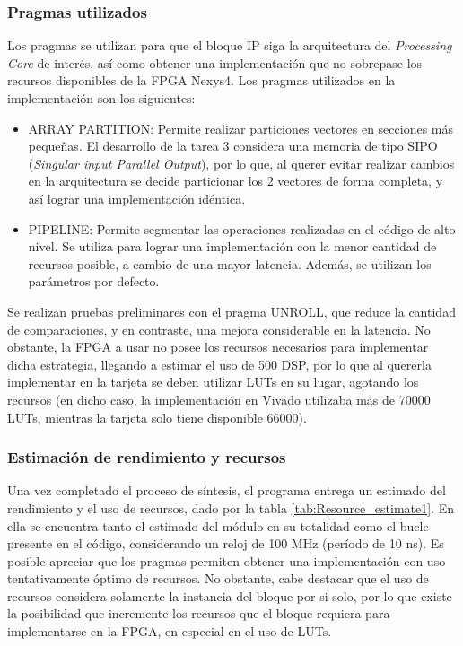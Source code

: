 \documentclass[conference]{IEEEtran}
\begin{document}
\subsubsection{Pragmas utilizados}
Los pragmas se utilizan para que el bloque IP siga la arquitectura del \textit{Processing Core} de interés, así como obtener una implementación que no sobrepase los recursos disponibles de la FPGA Nexys4. Los pragmas utilizados en la implementación son los siguientes:
\begin{itemize}
    \item ARRAY PARTITION: Permite realizar particiones vectores en secciones más pequeñas. El desarrollo de la tarea 3 considera una memoria de tipo SIPO (\textit{Singular input Parallel Output}), por lo que, al querer evitar realizar cambios en la arquitectura se decide particionar los 2 vectores de forma completa, y así lograr una implementación idéntica.
    \item PIPELINE: Permite segmentar las operaciones realizadas en el código de alto nivel. Se utiliza  para lograr una implementación con la menor cantidad de recursos posible, a cambio de una mayor latencia. Además, se utilizan los parámetros por defecto.
\end{itemize}

Se realizan pruebas preliminares con el pragma UNROLL, que reduce la cantidad de comparaciones, y en contraste, una mejora considerable en la latencia. No obstante, la FPGA a usar no posee los recursos necesarios para implementar dicha estrategia, llegando a estimar el uso de 500 DSP, por lo que al quererla implementar en la tarjeta se deben utilizar LUTs en su lugar, agotando los recursos (en dicho caso, la implementación en Vivado utilizaba más de 70000 LUTs, mientras la tarjeta solo tiene disponible 66000). 


\subsubsection{Estimación de rendimiento y recursos}
Una vez completado el proceso de síntesis, el programa entrega un estimado del rendimiento y el uso de recursos, dado por la tabla \ref{tab:Resource_estimate1}. En ella se encuentra tanto el estimado del módulo en su totalidad como el bucle presente en el código, considerando un reloj de 100 MHz (período de 10 ns). Es posible apreciar que los pragmas permiten obtener una implementación con uso tentativamente óptimo de recursos. No obstante, cabe destacar que el uso de recursos considera solamente la instancia del bloque por si solo, por lo que existe la posibilidad que incremente los recursos que el bloque requiera para implementarse en la FPGA, en especial en el uso de LUTs.
\end{document}
